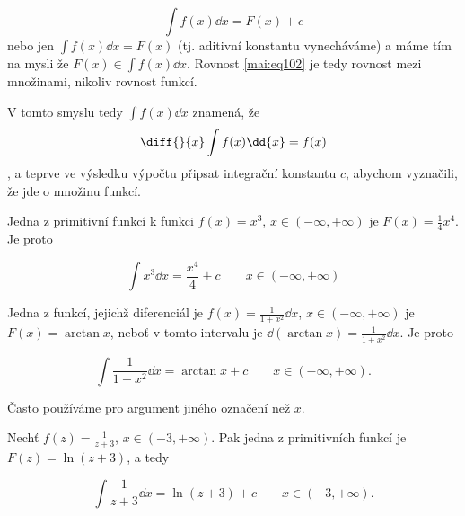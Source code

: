         \begin{equation}\label{mai:eq102}
          \int f(x)\dd{x} = F(x) + c
        \end{equation}
        nebo jen \(\int f(x)\dd{x} = F(x)\) (tj. aditivní konstantu vynecháváme) a máme tím na mysli
        že \(F(x) \in \int f(x)\dd{x}\). Rovnost \ref{mai:eq102} je tedy rovnost mezi množinami,
        nikoliv rovnost funkcí. 
        
        V tomto smyslu tedy \(\int f(x)\dd{x}\) znamená, že \[\diff{}{x}\int f(x)\dd{x} = f(x)\], a
        teprve ve výsledku výpočtu připsat integrační konstantu \(c\), abychom vyznačili, že jde o
        množinu funkcí.

        Jedna z primitivní funkcí k funkci \(f(x)=x^3\), \(x\in(-\infty, +\infty)\) je \(F(x)=
        \frac{1}{4}x^4\). Je proto
        \begin{fleqn}[\parindent]
          \begin{equation*}
            \int x^3\dd{x} = \frac{x^4}{4} + c \qquad x\in(-\infty, +\infty)
          \end{equation*}
        \end{fleqn} 

        Jedna z funkcí, jejichž diferenciál je \(f(x) = \frac{1}{1+x^2}\dd{x}\), \(x\in(-\infty,
        +\infty)\) je \(F(x) = \arctan x\), neboť v tomto intervalu je \(\dd{(\arctan x)} =
        \frac{1}{1+x^2}\dd{x}\). Je proto
        \begin{fleqn}[\parindent]
          \begin{equation*}
            \int\frac{1}{1+x^2}\dd{x} = \arctan x + c \qquad x\in(-\infty, +\infty).
          \end{equation*}
        \end{fleqn}
        Často používáme pro argument jiného označení než \(x\).

        Nechť \(f(z) = \frac{1}{z+3}\), \(x\in(-3, +\infty)\). Pak jedna z primitivních funkcí je
        \(F(z) = \ln(z+3)\), a tedy
        \begin{fleqn}[\parindent]
          \begin{equation*}
            \int\frac{1}{z+3}\dd{x} = \ln(z+3) + c \qquad x\in(-3, +\infty).
          \end{equation*}
        \end{fleqn}
    
